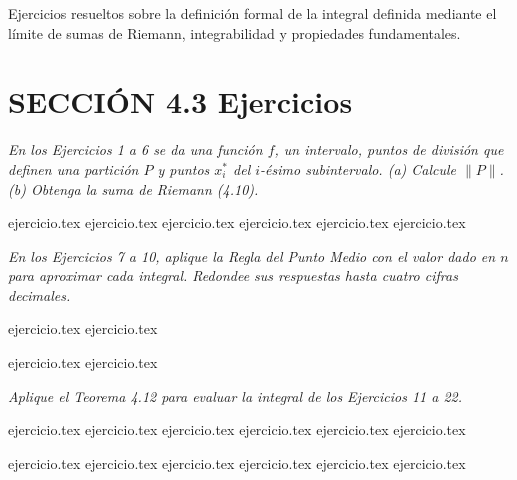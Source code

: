 
Ejercicios resueltos sobre la definición formal de la integral definida mediante el límite de sumas de Riemann, integrabilidad y propiedades fundamentales.

\section*{SECCIÓN 4.3 \quad Ejercicios}

\noindent \textit{En los Ejercicios 1 a 6 se da una función $f$, un intervalo, puntos de división que definen una partición $P$ y puntos $x_i^*$ del $i$-ésimo subintervalo. (a) Calcule $\|P\|$. (b) Obtenga la suma de Riemann (4.10).}

\begin{enumerate}
    {ejercicio.tex}
    {ejercicio.tex}
    {ejercicio.tex}
    {ejercicio.tex}
    {ejercicio.tex}
    {ejercicio.tex}
\end{enumerate}

\vspace{1em}
\noindent \textit{En los Ejercicios 7 a 10, aplique la Regla del Punto Medio con el valor dado en $n$ para aproximar cada integral. Redondee sus respuestas hasta cuatro cifras decimales.}

\begin{enumerate}
    \setcounter{enumi}{6}
    \begin{minipage}{0.45\textwidth}
    {ejercicio.tex}
    {ejercicio.tex}
    \end{minipage}%
    \begin{minipage}{0.45\textwidth}
    {ejercicio.tex}
    {ejercicio.tex}
    \end{minipage}
\end{enumerate}

\vspace{1em}
\noindent \textit{Aplique el Teorema 4.12 para evaluar la integral de los Ejercicios 11 a 22.}

\begin{enumerate}
    \setcounter{enumi}{10}
    \begin{minipage}{0.45\textwidth}
    {ejercicio.tex}
    {ejercicio.tex}
    {ejercicio.tex}
    {ejercicio.tex}
    {ejercicio.tex}
    {ejercicio.tex}
    \end{minipage}%
    \begin{minipage}{0.45\textwidth}
    {ejercicio.tex}
    {ejercicio.tex}
    {ejercicio.tex}
    {ejercicio.tex}
    {ejercicio.tex}
    {ejercicio.tex}
    \end{minipage}
\end{enumerate}

